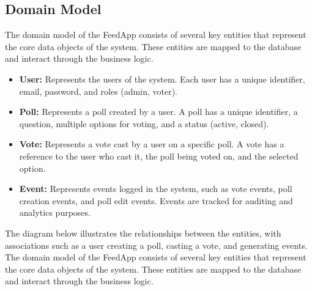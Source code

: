 \subsection{Domain Model}
The domain model of the FeedApp consists of several key entities that represent the core data objects of the system. These entities are mapped to the database and interact through the business logic.
\begin{itemize}
    \item \textbf{User:} Represents the users of the system. Each user has a unique identifier, email, password, and roles (admin, voter).
    \item \textbf{Poll:} Represents a poll created by a user. A poll has a unique identifier, a question, multiple options for voting, and a status (active, closed).
    \item \textbf{Vote:} Represents a vote cast by a user on a specific poll. A vote has a reference to the user who cast it, the poll being voted on, and the selected option.
    \item \textbf{Event:} Represents events logged in the system, such as vote events, poll creation events, and poll edit events. Events are tracked for auditing and analytics purposes.
\end{itemize}

\noindent The diagram below illustrates the relationships between the entities, with associations such as a user creating a poll, casting a vote, and generating events. The domain model of the FeedApp consists of several key entities that represent the core data objects of the system. These entities are mapped to the database and interact through the business logic.

